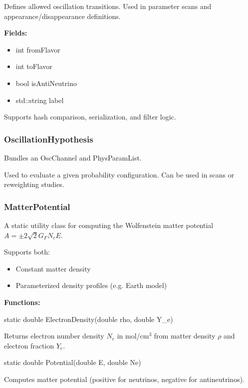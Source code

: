 Defines allowed oscillation transitions.  
Used in parameter scans and appearance/disappearance definitions.

\noindent\textbf{Fields:}

\begin{itemize}
  \item {\color{amber}int fromFlavor}
  \item {\color{amber}int toFlavor}
  \item {\color{amber}bool isAntiNeutrino}
  \item {\color{amber}std::string label}
\end{itemize}

Supports hash comparison, serialization, and filter logic.

\vspace{1em}
\subsubsection*{\color{cadmiumgreen}\bf OscillationHypothesis}

Bundles an {\color{cadmiumgreen} OscChannel} and {\color{amber}PhysParamList}.

Used to evaluate a given probability configuration.  
Can be used in scans or reweighting studies.

\vspace{1em}
\subsubsection*{\color{cadmiumgreen}\bf MatterPotential}

A static utility class for computing the Wolfenstein matter potential $A = \pm 2\sqrt{2} G_F N_e E$.

Supports both:
\begin{itemize}
  \item Constant matter density
  \item Parameterized density profiles (e.g. Earth model)
\end{itemize}

\vspace{0.5em}
\noindent\textbf{Functions:}

\begin{description}[align=left, labelsep=0.6em]
  \item[] {\color{cadmiumred} static double ElectronDensity(double rho, double Y\_e)}

  Returns electron number density $N_e$ in mol/cm$^3$ from matter density $\rho$ and electron fraction $Y_e$.

  \item[] {\color{cadmiumred} static double Potential(double E, double Ne)}

  Computes matter potential (positive for neutrinos, negative for antineutrinos).
\end{description}


